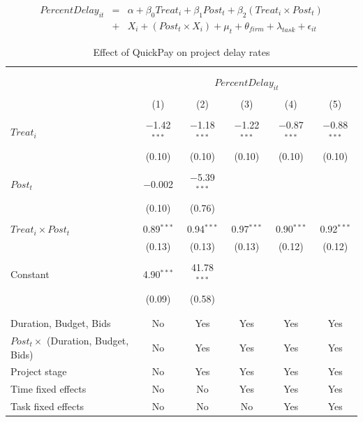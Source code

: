 \documentclass[
]{article}
\begin{document}
\[ \begin{aligned} PercentDelay_{it} &=& \alpha+\beta_0 Treat_i + \beta_1 Post_t + \beta_2 (Treat_i \times Post_t)\\
&+&  X_i + (Post_t \times X_i) + \mu_t + \theta_{firm} + \lambda_{task}+ \epsilon_{it}
\end{aligned}\]

\begin{table}[H] \centering 
  \caption{Effect of QuickPay on project delay rates} 
  \label{} 
\small 
\begin{tabular}{@{\extracolsep{-2pt}}lccccc} 
\\[-1.8ex]\hline 
\hline \\[-1.8ex] 
\\[-1.8ex] & \multicolumn{5}{c}{$PercentDelay_{it}$} \\ 
\\[-1.8ex] & (1) & (2) & (3) & (4) & (5)\\ 
\hline \\[-1.8ex] 
 $Treat_i$ & $-$1.42$^{***}$ & $-$1.18$^{***}$ & $-$1.22$^{***}$ & $-$0.87$^{***}$ & $-$0.88$^{***}$ \\ 
  & (0.10) & (0.10) & (0.10) & (0.10) & (0.10) \\ 
  & & & & & \\ 
 $Post_t$ & $-$0.002 & $-$5.39$^{***}$ &  &  &  \\ 
  & (0.10) & (0.76) &  &  &  \\ 
  & & & & & \\ 
 $Treat_i \times Post_t$ & 0.89$^{***}$ & 0.94$^{***}$ & 0.97$^{***}$ & 0.90$^{***}$ & 0.92$^{***}$ \\ 
  & (0.13) & (0.13) & (0.13) & (0.12) & (0.12) \\ 
  & & & & & \\ 
 Constant & 4.90$^{***}$ & 41.78$^{***}$ &  &  &  \\ 
  & (0.09) & (0.58) &  &  &  \\ 
  & & & & & \\ 
\hline \\[-1.8ex] 
Duration, Budget, Bids & No & Yes & Yes & Yes & Yes \\ 
$Post_t \times$  (Duration, Budget, Bids) & No & Yes & Yes & Yes & Yes \\ 
Project stage & No & Yes & Yes & Yes & Yes \\ 
Time fixed effects & No & No & Yes & Yes & Yes \\ 
Task fixed effects & No & No & No & Yes & Yes \\ 

\end{tabular}
\end{table}
\end{document}
